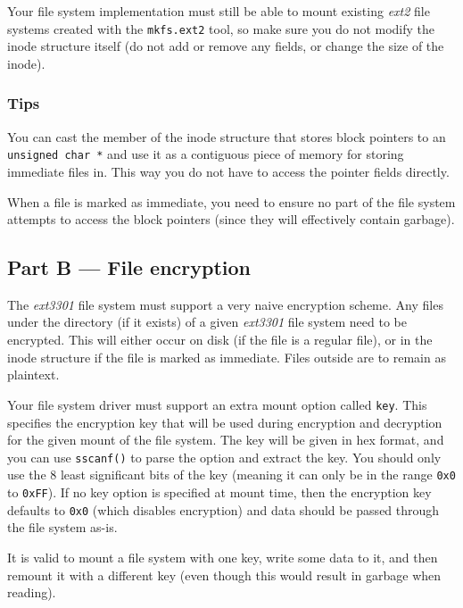 \documentclass[12pt,a4paper]{article}
\begin{document}
Your file system implementation must still be able to mount existing
\textit{ext2} file systems created with the \texttt{mkfs.ext2} tool, so make
sure you do not modify the inode structure itself (do not add or remove any
fields, or change the size of the inode).

\subsubsection*{Tips}

\begin{compactitem}
    \item You can cast the member of the inode structure that stores block
    pointers to an \texttt{unsigned char *} and use it as a contiguous piece of
    memory for storing immediate files in. This way you do not have to access the
    pointer fields directly.
    \item When a file is marked as immediate, you need to ensure no part of the
    file system attempts to access the block pointers (since they will effectively
    contain garbage).
\end{compactitem}

\subsection*{Part B --- File encryption}

The \textit{ext3301} file system must support a very naive encryption scheme.
Any files under the  directory (if it exists) of a given
\textit{ext3301} file system need to be encrypted. This will either occur on
disk (if the file is a regular file), or in the inode structure if the file is
marked as immediate. Files outside  are to remain as plaintext.

Your file system driver must support an extra mount option called \texttt{key}.
This specifies the encryption key that will be used during encryption and 
decryption for the given mount of the file system. The key will be given in hex
format, and you can use \texttt{sscanf()} to parse the option and extract the
key.  You should only use the 8 least significant bits of the key (meaning it
can only be in the range \texttt{0x0} to \texttt{0xFF}). If no key option is
specified at mount time, then the encryption key defaults to \texttt{0x0}
(which disables encryption) and data should be passed through the file system
as-is.

It is valid to mount a file system with one key, write some data to it, and
then remount it with a different key (even though this would result in garbage
when reading).
\end{document}
